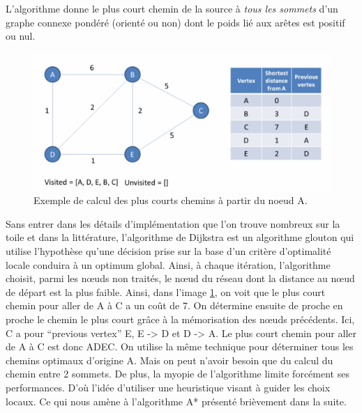 L'algorithme donne le plus court chemin de la source à \textit{tous les sommets} d'un graphe 
connexe pondéré (orienté ou non) dont le poids lié aux arêtes est positif ou nul.



 


\begin{figure}[htp]
  \centering
  \includegraphics[width=15cm]{images/algo_dij}
  \caption{Exemple de calcul des plus courts chemins à partir du noeud A.}
  \label{fig:graph_dij}
\end{figure}

Sans entrer dans les détails d'implémentation que l'on trouve nombreux sur la toile et dans la littérature, l'algorithme de Dijkstra est 
un algorithme glouton qui utilise l'hypothèse qu'une décision prise sur la base
d'un critère d'optimalité locale conduira à un optimum global. Ainsi, à chaque itération, l'algorithme choisit, parmi les nœuds non traités, le nœud
du réseau dont la distance au nœud de départ est la plus faible. Ainsi, dans l'image \ref{fig:graph_dij}, on voit que le plus court chemin pour aller de A à C a un coût de 7. On détermine ensuite de proche en proche le chemin le plus court grâce à la mémorisation des nœuds précédents. Ici, C a pour ``previous vertex'' E, 
E -> D et D -> A. Le plus court chemin pour aller de A à C est donc ADEC. On utilise la même technique pour déterminer tous les chemins optimaux 
d'origine A. Mais on peut n'avoir besoin que du calcul du chemin entre 2 sommets. De plus, la myopie de l'algorithme limite forcément ses performances. D'où l'idée
d'utiliser une heuristique visant à guider les choix locaux. Ce qui nous amène à l'algorithme A* présenté brièvement dans la suite.

%   
